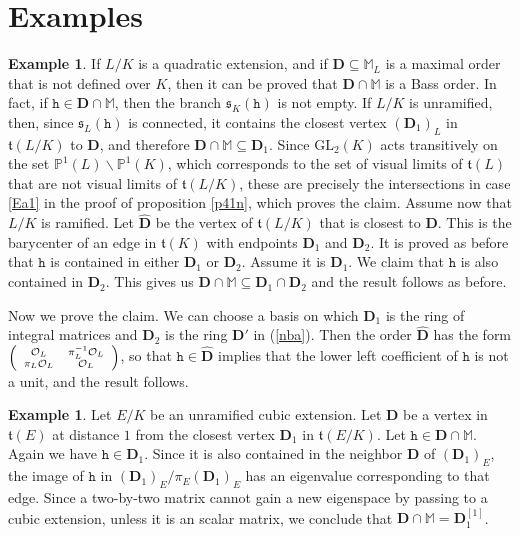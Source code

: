 \documentclass{amsart}
\theoremstyle{definition}
\newtheorem{example}[theorem]{Example}
\newcommand\alge{\mathbb{M}}
\newcommand\oink{\mathcal O}
\newcommand\Da{\mathbf{D}}
\newcommand\sbmattrix[4]{\textnormal{\scriptsize$\left(\begin{array}{cc}#1&#2\\#3&#4\end{array}\right)$\normalsize}}
\begin{document}
\section{Examples}

\begin{example}\label{e61}
    If $L/K$ is a quadratic extension, and if
    $\Da\subseteq\alge_L$ is a maximal 
    order that is not defined over $K$, then
    it can be proved that $\Da\cap\alge $
    is a Bass order. In fact, if
    $\mathtt{h}\in\Da\cap\alge $,
    then the branch 
    $\mathfrak{s}_K(\mathtt{h})$ is not empty.
    If $L/K$ is unramified, then, since 
    $\mathfrak{s}_L(\mathtt{h})$ is connected,
    it contains the closest vertex $(\Da_1)_L$ in 
    $\mathfrak{t}(L/K)$ to $\Da$, and therefore
    $\Da\cap\alge \subseteq\Da_1$.
    Since $\mathrm{GL}_2(K)$ acts transitively
    on the set $\mathbb{P}^1(L)\smallsetminus
    \mathbb{P}^1(K)$, which corresponds to the
    set of visual limits of $\mathfrak{t}(L)$
    that are not visual limits of
    $\mathfrak{t}(L/K)$, these are precisely 
    the intersections in case \ref{Ea1} in the
    proof of proposition \ref{p41n}, which proves the claim. Assume now that $L/K$ is 
    ramified. Let $\hat{\Da}$ be the vertex of
    $\mathfrak{t}(L/K)$ that is closest to $\Da$.
    This is the barycenter of an edge in $\mathfrak{t}(K)$ with endpoints 
    $\Da_1$ and $\Da_2$. It is proved
    as before that $\mathtt{h}$ is contained
    in either $\Da_1$ or $\Da_2$.
    Assume it is $\Da_1$. We claim that
    $\mathtt{h}$ is also contained
    in $\Da_2$. This gives us 
    $\Da\cap\alge \subseteq\Da_1\cap\Da_2$ and 
    the result follows as before.
    
    Now we prove the claim.
    We can choose a basis on which
    $\Da_1$ is the ring of integral matrices
    and $\Da_2$ is the ring $\Da'$ in 
    (\ref{nba}). Then the order
    $\hat{\Da}$ has the form 
    $\sbmattrix {\oink_L}{\pi_L^{-1}\oink_L}
    {\pi_L\oink_L}{\oink_L}$,
    so that $\mathtt{h}\in\hat{\Da}$
    implies that the lower left coefficient
    of $\mathtt{h}$ is not a unit, and the result follows. 
\end{example}

\begin{example}
    Let $E/K$ be an unramified cubic extension.
    Let $\Da$ be a vertex in $\mathfrak{t}(E)$
    at distance $1$ from the closest vertex
    $\Da_1$ in $\mathfrak{t}(E/K)$. Let
    $\mathtt{h}\in\Da\cap\alge $.
    Again we have $\mathtt{h}\in\Da_1$.
    Since it is also contained in the
    neighbor $\Da$ of $(\Da_1)_E$,
     the image of $\mathtt{h}$ in
    $(\Da_1)_E/\pi_E(\Da_1)_E$ has an eigenvalue
    corresponding to that edge. Since
    a two-by-two matrix cannot gain a
    new eigenspace by passing to a cubic
    extension, unless it is an scalar matrix,
    we conclude that $\Da\cap\alge =
    \Da_1^{[1]}$.
\end{example}
\end{document}
